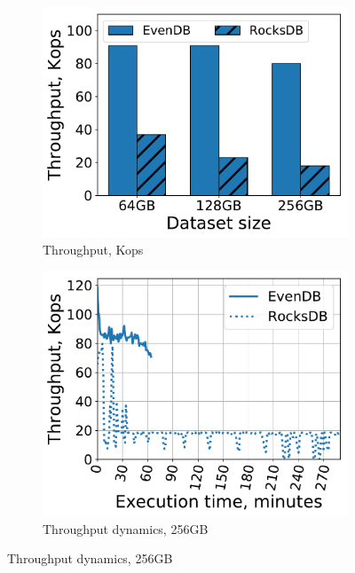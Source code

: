\begin{figure}[tb]
\centering
\begin{subfigure}{0.29\linewidth}
\includegraphics[width=\textwidth]{figs/ingestion.pdf}
\caption{Throughput, Kops}
\label{fig:prod:ingestion:a}
\end{subfigure}
\hspace{0.03\linewidth} 
\begin{subfigure}{0.29\linewidth}
\includegraphics[width=\textwidth]{figs/throughput_256_ingestions_line.pdf}
\caption{Throughput dynamics, 256GB}
\label{fig:prod:ingestion:b}
\end{subfigure}
\hspace{0.03\linewidth} 

\end{figure}
